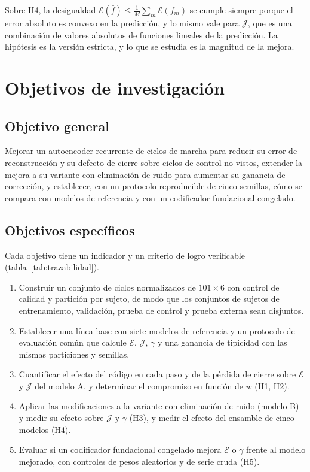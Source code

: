 \documentclass[11pt,a4paper]{article}
\begin{document}
Sobre H4, la desigualdad $\mathcal E(\bar f)\le\frac1M\sum_m\mathcal E(f_m)$ se cumple siempre porque el error absoluto es convexo en la predicción, y lo mismo vale para $\mathcal J$, que es una combinación de valores absolutos de funciones lineales de la predicción. La hipótesis es la versión estricta, y lo que se estudia es la magnitud de la mejora.

\section{Objetivos de investigación}
\label{sec:objetivos}

\subsection{Objetivo general}

Mejorar un autoencoder recurrente de ciclos de marcha para reducir su error de reconstrucción y su defecto de cierre sobre ciclos de control no vistos, extender la mejora a su variante con eliminación de ruido para aumentar su ganancia de corrección, y establecer, con un protocolo reproducible de cinco semillas, cómo se compara con modelos de referencia y con un codificador fundacional congelado.

\subsection{Objetivos específicos}

Cada objetivo tiene un indicador y un criterio de logro verificable (tabla~\ref{tab:trazabilidad}).
\begin{enumerate}[label=\textbf{O\arabic*.},leftmargin=2.2em]
\item Construir un conjunto de ciclos normalizados de $101\times 6$ con control de calidad y partición por sujeto, de modo que los conjuntos de sujetos de entrenamiento, validación, prueba de control y prueba externa sean disjuntos.
\item Establecer una línea base con siete modelos de referencia y un protocolo de evaluación común que calcule $\mathcal E$, $\mathcal J$, $\gamma$ y una ganancia de tipicidad con las mismas particiones y semillas.
\item Cuantificar el efecto del código en cada paso y de la pérdida de cierre sobre $\mathcal E$ y $\mathcal J$ del modelo A, y determinar el compromiso en función de $w$ (H1, H2).
\item Aplicar las modificaciones a la variante con eliminación de ruido (modelo B) y medir su efecto sobre $\mathcal J$ y $\gamma$ (H3), y medir el efecto del ensamble de cinco modelos (H4).
\item Evaluar si un codificador fundacional congelado mejora $\mathcal E$ o $\gamma$ frente al modelo mejorado, con controles de pesos aleatorios y de serie cruda (H5).
\end{enumerate}
\end{document}
